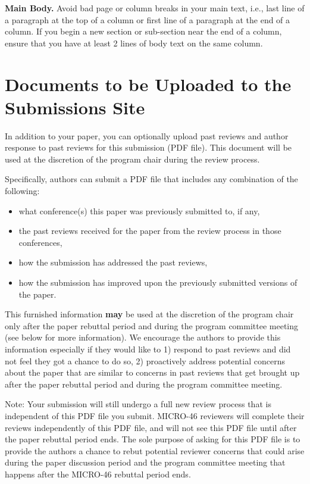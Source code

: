 \documentclass[pageno]{jpaper}
\begin{document}
\noindent\textbf{Main Body.} Avoid bad page or column breaks in
your main text, i.e., last line of a paragraph at the top of a
column or first line of a paragraph at the end of a column. If you
begin a new section or sub-section near the end of a column,
ensure that you have at least 2 lines of body text on the same
column. 

\section{Documents to be Uploaded to the Submissions Site}

In addition to your paper, you can optionally upload past reviews and
author response to past reviews for this submission (PDF file). This
document will be used at the discretion of the program chair during
the review process.

Specifically, authors can submit a PDF file that includes any
combination of the following:

\begin{itemize}
\item what conference(s) this paper was previously submitted to, if any,
\item the past reviews received for the paper from the review process in those conferences,
\item how the submission has addressed the past reviews,
\item how the submission has improved upon the previously submitted versions of the paper.
\end{itemize}

This furnished information \textbf{may} be used at the discretion of
the program chair only after the paper rebuttal period and during the
program committee meeting (see below for more information). We
encourage the authors to provide this information especially if they
would like to 1) respond to past reviews and did not feel they got a
chance to do so, 2) proactively address potential concerns about the
paper that are similar to concerns in past reviews that get brought up
after the paper rebuttal period and during the program committee
meeting.

Note: Your submission will still undergo a full new review process
that is independent of this PDF file you submit. MICRO-46 reviewers
will complete their reviews independently of this PDF file, and will
not see this PDF file until after the paper rebuttal period ends. The
sole purpose of asking for this PDF file is to provide the authors a
chance to rebut potential reviewer concerns that could arise during
the paper discussion period and the program committee meeting that
happens after the MICRO-46 rebuttal period ends.
\end{document}
